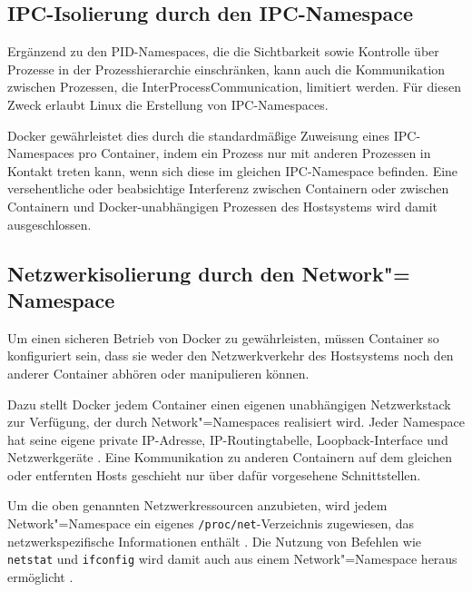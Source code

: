 \documentclass[../main.tex]{subfiles}
\begin{document}
    \subsection{\acrshort{IPC}-Isolierung durch den \acrshort{IPC}-Namespace}
			Ergänzend zu den PID-Namespaces, die die Sichtbarkeit sowie Kontrolle über Prozesse in der Prozesshierarchie einschränken, kann auch die Kommunikation zwischen Prozessen, die \gls{InterProcessCommunication}, limitiert werden. Für diesen Zweck erlaubt Linux die Erstellung von IPC-Namespaces.




			Docker gewährleistet dies durch die standardmäßige Zuweisung eines IPC-Namespaces pro Container, indem ein Prozess nur mit anderen Prozessen in Kontakt treten kann, wenn sich diese im gleichen IPC-Namespace befinden. Eine versehentliche oder beabsichtige Interferenz zwischen Containern oder zwischen Containern und Docker-unabhängigen Prozessen des Hostsystems wird damit ausgeschlossen.



    \subsection{Netzwerkisolierung durch den Network"=\\Namespace}
			Um einen sicheren Betrieb von Docker zu gewährleisten, müssen Container so konfiguriert sein, dass sie weder den Netzwerkverkehr des Hostsystems noch den anderer Container abhören oder manipulieren können.

			Dazu stellt Docker jedem Container einen eigenen unabhängigen Netzwerkstack zur Verfügung, der durch Network"=Namespaces realisiert wird. Jeder Namespace hat seine eigene private \acrshort{IP}-Adresse, IP-Routingtabelle, Loopback-Interface und Netzwerkgeräte \cite[S.2f.]{virtVSContainer}. Eine Kommunikation zu anderen Containern auf dem gleichen oder entfernten Hosts geschieht nur über dafür vorgesehene Schnittstellen.

			Um die oben genannten Netzwerkressourcen anzubieten, wird jedem Network"=Namespace ein eigenes \texttt{/proc/net}-Verzeichnis zugewiesen, das netzwerkspezifische Informationen enthält \cite{proc}. Die Nutzung von Befehlen wie \texttt{netstat} und \texttt{ifconfig} wird damit auch aus einem Network"=Namespace heraus ermöglicht \cite[S.7]{IBMcheckpointRestart}.
\end{document}
